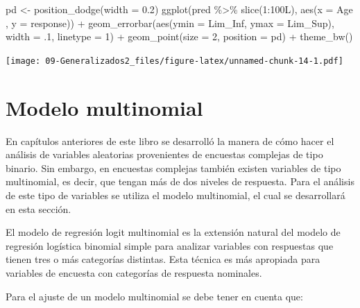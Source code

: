 \documentclass[
  12pt,
]{book}
\newenvironment{Shaded}{\begin{snugshade}}{\end{snugshade}}
\newcommand{\AttributeTok}[1]{\textcolor[rgb]{0.77,0.63,0.00}{#1}}
\newcommand{\DecValTok}[1]{\textcolor[rgb]{0.00,0.00,0.81}{#1}}
\newcommand{\FloatTok}[1]{\textcolor[rgb]{0.00,0.00,0.81}{#1}}
\newcommand{\FunctionTok}[1]{\textcolor[rgb]{0.00,0.00,0.00}{#1}}
\newcommand{\NormalTok}[1]{#1}
\newcommand{\OtherTok}[1]{\textcolor[rgb]{0.56,0.35,0.01}{#1}}
\newcommand{\SpecialCharTok}[1]{\textcolor[rgb]{0.00,0.00,0.00}{#1}}
\begin{document}
\begin{Shaded}
\begin{Highlighting}[]
\NormalTok{pd }\OtherTok{\textless{}{-}} \FunctionTok{position\_dodge}\NormalTok{(}\AttributeTok{width =} \FloatTok{0.2}\NormalTok{)}
\FunctionTok{ggplot}\NormalTok{(pred }\SpecialCharTok{\%\textgreater{}\%} \FunctionTok{slice}\NormalTok{(}\DecValTok{1}\SpecialCharTok{:}\NormalTok{100L),}
       \FunctionTok{aes}\NormalTok{(}\AttributeTok{x =}\NormalTok{ Age , }\AttributeTok{y =}\NormalTok{ response)) }\SpecialCharTok{+}
  \FunctionTok{geom\_errorbar}\NormalTok{(}\FunctionTok{aes}\NormalTok{(}\AttributeTok{ymin =}\NormalTok{ Lim\_Inf,}
                    \AttributeTok{ymax =}\NormalTok{ Lim\_Sup),}
                \AttributeTok{width =}\NormalTok{ .}\DecValTok{1}\NormalTok{,}
                \AttributeTok{linetype =} \DecValTok{1}\NormalTok{) }\SpecialCharTok{+}
  \FunctionTok{geom\_point}\NormalTok{(}\AttributeTok{size =} \DecValTok{2}\NormalTok{, }\AttributeTok{position =}\NormalTok{ pd) }\SpecialCharTok{+}
  \FunctionTok{theme\_bw}\NormalTok{()}
\end{Highlighting}
\end{Shaded}

\texttt{[image: 09-Generalizados2\_files/figure-latex/unnamed-chunk-14-1.pdf]}

\hypertarget{modelo-multinomial}{%
\section{Modelo multinomial}\label{modelo-multinomial}}

En capítulos anteriores de este libro se desarrolló la manera de cómo hacer el análisis de variables aleatorias provenientes de encuestas complejas de tipo binario. Sin embargo, en encuestas complejas también existen variables de tipo multinomial, es decir, que tengan más de dos niveles de respuesta. Para el análisis de este tipo de variables se utiliza el modelo multinomial, el cual se desarrollará en esta sección.

El modelo de regresión logit multinomial es la extensión natural del modelo de regresión logística binomial simple para analizar variables con respuestas que tienen tres o más categorías distintas. Esta técnica es más apropiada para variables de encuesta con categorías de respuesta nominales.

Para el ajuste de un modelo multinomial se debe tener en cuenta que:
\end{document}
